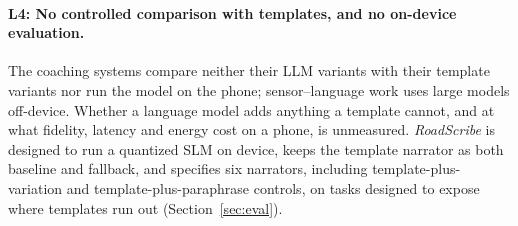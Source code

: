\paragraph{L4: No controlled comparison with templates, and no on-device evaluation.}
The coaching systems compare neither their LLM variants with their template variants nor run the model on the phone; sensor--language work uses large models off-device.
Whether a language model adds anything a template cannot, and at what fidelity, latency and energy cost on a phone, is unmeasured.
\emph{RoadScribe} is designed to run a quantized SLM on device, keeps the template narrator as both baseline and fallback, and specifies six narrators, including template-plus-variation and template-plus-paraphrase controls, on tasks designed to expose where templates run out (Section~\ref{sec:eval}).
